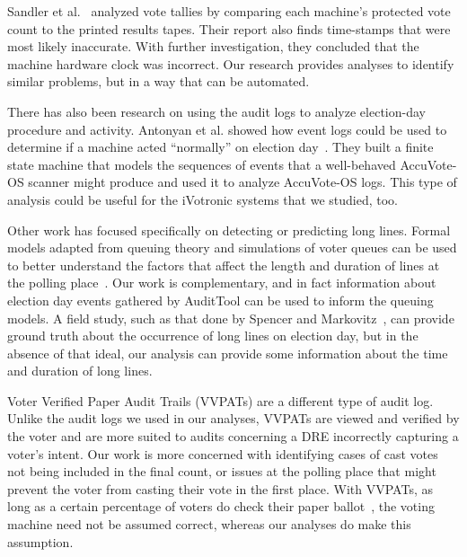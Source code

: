 \documentclass[letterpaper,twocolumn,10pt]{article}
\begin{document}
Sandler et al.~\cite{Sandler2007} analyzed vote tallies by comparing each
machine's protected vote count to the printed results tapes. Their report also
finds time-stamps that were most likely inaccurate. With further investigation,
they concluded that the machine hardware clock was incorrect. Our research
provides analyses to identify similar problems, but in a way that can be
automated.   

There has also been research on using the audit logs to analyze election-day
procedure and activity. Antonyan et al. showed how event logs could be used to
determine if a machine acted ``normally'' on election
day~\cite{Antonyan2009}. They built a finite state machine that models the
sequences of events that a well-behaved AccuVote-OS scanner might produce and
used it to analyze AccuVote-OS logs. This type of analysis could be useful for
the iVotronic systems that we studied, too.  

Other work has focused specifically on detecting or predicting long
lines. Formal models adapted from queuing theory and simulations of voter queues
can be used to better understand the factors that affect the length and duration
of lines at the polling place~\cite{Allen2006, Edel2010}. Our work is
complementary, and in fact information about election day events gathered by
AuditTool can be used to inform the queuing models. A field study, such as that
done by Spencer and Markovitz~\cite{Spencer2010}, can provide ground truth about
the occurrence of long lines on election day, but in the absence of that ideal,
our analysis can provide some information about the time and duration of long
lines. 

Voter Verified Paper Audit Trails (VVPATs) are a different type of audit
log. Unlike the audit logs we used in our analyses, VVPATs are viewed and
verified by the voter and are more suited to audits concerning a DRE incorrectly
capturing a voter’s intent. Our work is more concerned with identifying cases of
cast votes not being included in the final count, or issues at the polling place
that might prevent the voter from casting their vote in the first place. With
VVPATs, as long as a certain percentage of voters do check their paper
ballot~\cite{Hall2006}, the voting machine need not be assumed correct, whereas
our analyses do make this assumption. 
\end{document}
